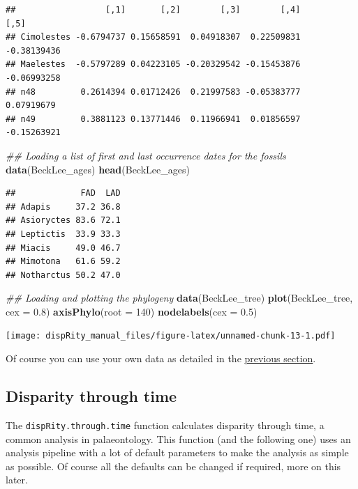 \documentclass[
]{book}
\newenvironment{Shaded}{\begin{snugshade}}{\end{snugshade}}
\newcommand{\CommentTok}[1]{\textcolor[rgb]{0.56,0.35,0.01}{\textit{#1}}}
\newcommand{\DataTypeTok}[1]{\textcolor[rgb]{0.13,0.29,0.53}{#1}}
\newcommand{\DecValTok}[1]{\textcolor[rgb]{0.00,0.00,0.81}{#1}}
\newcommand{\FloatTok}[1]{\textcolor[rgb]{0.00,0.00,0.81}{#1}}
\newcommand{\KeywordTok}[1]{\textcolor[rgb]{0.13,0.29,0.53}{\textbf{#1}}}
\newcommand{\NormalTok}[1]{#1}
\begin{document}
\begin{verbatim}
##                  [,1]       [,2]        [,3]        [,4]        [,5]
## Cimolestes -0.6794737 0.15658591  0.04918307  0.22509831 -0.38139436
## Maelestes  -0.5797289 0.04223105 -0.20329542 -0.15453876 -0.06993258
## n48         0.2614394 0.01712426  0.21997583 -0.05383777  0.07919679
## n49         0.3881123 0.13771446  0.11966941  0.01856597 -0.15263921
\end{verbatim}

\begin{Shaded}
\begin{Highlighting}[]
\CommentTok{\#\# Loading a list of first and last occurrence dates for the fossils}
\KeywordTok{data}\NormalTok{(BeckLee\_ages)}
\KeywordTok{head}\NormalTok{(BeckLee\_ages)}
\end{Highlighting}
\end{Shaded}

\begin{verbatim}
##             FAD  LAD
## Adapis     37.2 36.8
## Asioryctes 83.6 72.1
## Leptictis  33.9 33.3
## Miacis     49.0 46.7
## Mimotona   61.6 59.2
## Notharctus 50.2 47.0
\end{verbatim}

\begin{Shaded}
\begin{Highlighting}[]
\CommentTok{\#\# Loading and plotting the phylogeny}
\KeywordTok{data}\NormalTok{(BeckLee\_tree)}
\KeywordTok{plot}\NormalTok{(BeckLee\_tree, }\DataTypeTok{cex =} \FloatTok{0.8}\NormalTok{) }
\KeywordTok{axisPhylo}\NormalTok{(}\DataTypeTok{root =} \DecValTok{140}\NormalTok{)}
\KeywordTok{nodelabels}\NormalTok{(}\DataTypeTok{cex =} \FloatTok{0.5}\NormalTok{)}
\end{Highlighting}
\end{Shaded}

\texttt{[image: dispRity\_manual\_files/figure-latex/unnamed-chunk-13-1.pdf]}

Of course you can use your own data as detailed in the \protect\hyperlink{What-sort-of-data-does-dispRity-work-with}{previous section}.

\hypertarget{disparity-through-time}{%
\subsection{Disparity through time}\label{disparity-through-time}}

The \texttt{dispRity.through.time} function calculates disparity through time, a common analysis in palaeontology.
This function (and the following one) uses an analysis pipeline with a lot of default parameters to make the analysis as simple as possible.
Of course all the defaults can be changed if required, more on this later.
\end{document}
